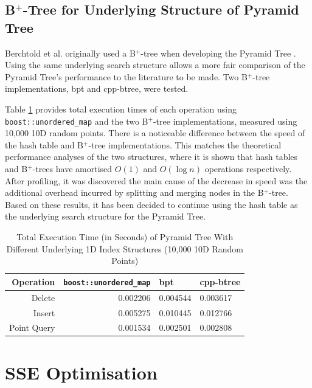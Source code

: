 \subsection{B${}^+$-Tree for Underlying Structure of Pyramid Tree}

Berchtold et al. originally used a B${}^{+}$-tree when developing the Pyramid Tree \cite{pyramid-tree}. Using the same underlying search structure allows a more fair comparison of the Pyramid Tree's performance to the literature to be made. Two B${}^{+}$-tree implementations, bpt\cite{bpt} and cpp-btree\cite{cpp-btree}, were tested.

Table \ref{tab:hashtable-bplus-time-comparison} provides total execution times of each operation using \texttt{boost::unordered\_map} and the two B${}^{+}$-tree implementations, measured using 10,000 10D random points. There is a noticeable difference between the speed of the hash table and B${}^{+}$-tree implementations. This matches the theoretical performance analyses of the two structures, where it is shown that hash tables and B${}^{+}$-trees have amortised $O(1)$ and $O(\log n)$ operations respectively. After profiling, it was discovered the main cause of the decrease in speed was the additional overhead incurred by splitting and merging nodes in the B${}^{+}$-tree. Based on these results, it has been decided to continue using the hash table as the underlying search structure for the Pyramid Tree.

\begin{table}
	\centering
	\begin{tabular}{|r|r|l|l|}
		\hline
		\textbf{Operation} & \texttt{boost::unordered\_map} & bpt & cpp-btree  \\
		\hline
		Delete & 0.002206 & 0.004544 & 0.003617 \\
		Insert & 0.005275 & 0.010445 & 0.012766 \\
		Point Query & 0.001534 & 0.002501 & 0.002808 \\
		\hline
	\end{tabular}
	\caption{Total Execution Time (in Seconds) of Pyramid Tree With Different Underlying 1D Index Structures (10,000 10D Random Points)}
	\label{tab:hashtable-bplus-time-comparison}
\end{table}

\section{SSE Optimisation}

